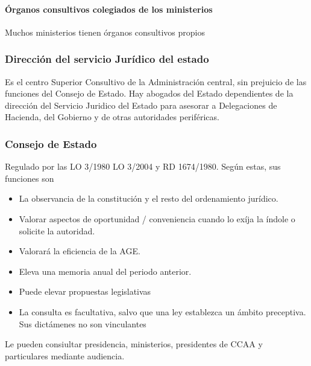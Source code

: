         \paragraph{Órganos consultivos colegiados de los ministerios}
            Muchos ministerios tienen órganos consultivos propios
    
    \subsubsection{Dirección del servicio Jurídico del estado}
        Es el centro Superior Consultivo de la Administración central, sin prejuicio de las funciones del Consejo de Estado. Hay abogados del Estado dependientes de la dirección del Servicio Juridico del Estado para asesorar a Delegaciones de Hacienda, del Gobierno y de otras autoridades periféricas.
    
    \subsubsection{Consejo de Estado}
        Regulado por las LO 3/1980 LO 3/2004 y RD 1674/1980. Según estas, sus funciones son
        \begin{itemize}
            \item La observancia de la constitución y el resto del ordenamiento jurídico.
            \item Valorar aspectos de oportunidad / conveniencia cuando lo exíja la índole o solicite la autoridad.
            \item Valorará la eficiencia de la AGE.
            \item Eleva una memoria anual del periodo anterior.
            \item Puede elevar propuestas legislativas
            \item La consulta es facultativa, salvo que una ley establezca un ámbito preceptiva. Sus dictámenes no son vinculantes
        \end{itemize}
        Le pueden consiultar presidencia, ministerios, presidentes de CCAA y particulares mediante audiencia.


